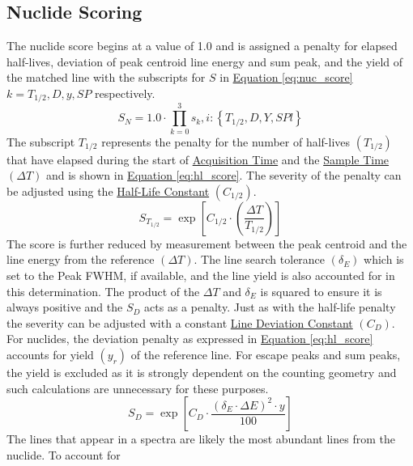 \documentclass[12pt,report,justified]{SANDreport}
\begin{document}
        \subsection{Nuclide Scoring}\label{sec:nuc_score}
The nuclide score begins at a value of 1.0 and is assigned a penalty for elapsed half-lives, deviation
of peak centroid line energy and sum peak, and the yield of the matched line with the subscripts
for \(S\) in \hyperref[eq:nuc_score]{Equation \ref{eq:nuc_score}} \(k = T_{1/2},D, y, SP\) respectively.
\begin{equation}
    S_N = 1.0 \cdot \prod_{k=0}^{3} s_k, i: \left\{T_{1/2},D,Y,SPl\right\}
   \label{eq:nuc_score}
\end{equation}
The subscript \(T_{1/2}\) represents the penalty for the number of half-lives \(\left(T_{1/2}\right)\) that have elapsed
during the start of \hyperref[itm:time_acq]{Acquisition Time} and the \hyperref[itm:time_smp]{Sample Time}
\(\left( \Delta T\right)\) and is shown in \hyperref[eq:hl_score]{Equation \ref{eq:hl_score}}. The severity of the
penalty can be adjusted using the \hyperref[itm:hl_const]{Half-Life Constant} \(\left(C_{1/2}\right) \).
\begin{equation}
S_{T_{1/2}} = \exp{\left[ C_{1/2} \cdot \left( \frac{\Delta T}{T_{1/2}} \right) \right]}
\label{eq:hl_score}
\end{equation}
The score is further reduced by measurement between the peak centroid and the line energy from
the reference \(\left( \Delta T\right)\). The line search tolerance  \(\left( \delta _E\right)\) which is set to
the Peak FWHM, if available, and the line yield is also accounted for in this determination. The
product of the  \(\Delta T\) and \( \delta _E\) is squared to ensure it is always positive and the \(S_D\)
acts as a penalty. Just as with the half-life penalty the severity can be adjusted with a constant
\hyperref[itm:ln_dev_const]{Line Deviation Constant} \(\left(C_D \right)\). For nuclides, the deviation penalty
as expressed in \hyperref[eq:hl_score]{Equation \ref{eq:hl_score}} accounts for yield  \(\left( y_r \right)\) of
 the reference line. For escape peaks and sum peaks, the yield is excluded as it is strongly dependent on
the counting geometry and such calculations are unnecessary for these purposes.
\begin{equation}
S_D = \exp{\left[ C_D \cdot \frac{\left(\delta_E \cdot \Delta E \right)^2 \cdot y}{100} \right]}
\label{eq:dev_score}
\end{equation}
The lines that appear in a spectra are likely the most abundant lines from the nuclide. To account for
\end{document}
